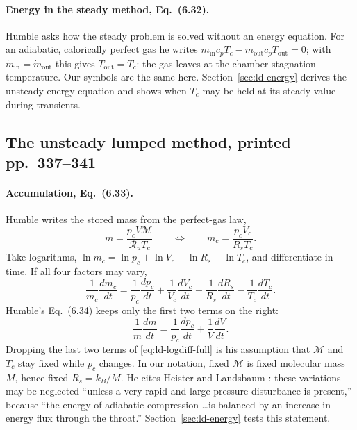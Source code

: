 \paragraph{Energy in the steady method, Eq.~(6.32).}
Humble asks how the steady problem is solved without an energy
equation. For an adiabatic, calorically perfect gas he writes
$\dot m_{\mathrm{in}}c_pT_c-\dot m_{\mathrm{out}}c_pT_{\mathrm{out}}=0$;
with $\dot m_{\mathrm{in}}=\dot m_{\mathrm{out}}$ this gives
$T_{\mathrm{out}}=T_c$: the gas leaves at the chamber stagnation
temperature. Our symbols are the same here. Section~\ref{sec:ld-energy}
derives the unsteady energy equation and shows when $T_c$ may be held
at its steady value during transients.

\subsection{The unsteady lumped method, printed pp.~337--341}
\label{sec:ld-unsteady}
\paragraph{Accumulation, Eq.~(6.33).} Humble writes the stored mass
from the perfect-gas law,
\[
 m=\frac{p_cV\mathcal M}{\mathcal R_uT_c}
 \qquad\Longleftrightarrow\qquad
 m_c=\frac{p_cV_c}{R_sT_c}.
\]
Take logarithms, $\ln m_c=\ln p_c+\ln V_c-\ln R_s-\ln T_c$, and
differentiate in time. If all four factors may vary,
\begin{equation}\label{eq:ld-logdiff-full}
 \frac1{m_c}\frac{dm_c}{dt}
 =\frac1{p_c}\frac{dp_c}{dt}+\frac1{V_c}\frac{dV_c}{dt}
  -\frac1{R_s}\frac{dR_s}{dt}-\frac1{T_c}\frac{dT_c}{dt}.
\end{equation}
Humble's Eq.~(6.34) keeps only the first two terms on the right:
\[
 \frac1m\frac{dm}{dt}=\frac1{p_c}\frac{dp_c}{dt}+\frac1V\frac{dV}{dt}.
\]
Dropping the last two terms of \eqref{eq:ld-logdiff-full} is his
assumption that $\mathcal M$ and $T_c$ stay fixed while $p_c$ changes.
In our notation, fixed $\mathcal M$ is fixed molecular mass $M$, hence
fixed $R_s=k_B/M$.
He cites Heister and Landsbaum \cite{heisterlandsbaum1991}: these
variations may be neglected ``unless a very rapid and large pressure
disturbance is present,'' because ``the energy of adiabatic compression
\ldots is balanced by an increase in energy flux through the throat.''
Section~\ref{sec:ld-energy} tests this statement.

